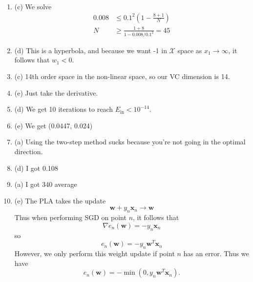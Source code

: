 \documentclass[12pt]{article}
\begin{document}
\begin{enumerate}[leftmargin=*]
\item (c) We solve
\begin{align*}
0.008 &\leq 0.1^2 \left( 1 - \frac{8 + 1}{N} \right) \\
N & \geq \frac{1 + 8}{1 - 0.008 / 0.1^2} = 45
\end{align*}
\item (d) This is a hyperbola, and because we want -1 in $\mathcal X$ space as $x_1 \to \infty$, it follows that $w_1 < 0$.
\item (c) 14th order space in the non-linear space, so our VC dimension is 14.
\item (e) Just take the derivative.
\item (d) We get 10 iterations to reach $E_{\text{in}} < 10^{-14}$.
\item (e) We get (0.0447, 0.024)
\item (a) Using the two-step method sucks because you're not going in the optimal direction.
\item (d) I got 0.108
\item (a) I got 340 average
\item (e) The PLA takes the update
\[ \mathbf w + y_n \mathbf x_n \to \mathbf w \]
Thus when performing SGD on point $n$, it follows that 
\[ \nabla e_n(\mathbf w) = - y_n \mathbf x_n \]
so 
\[ e_n(\mathbf w) = - y_n \mathbf w^T \mathbf x_n \]
However, we only perform this weight update if point $n$ has an error. Thus we have
\[ e_n(\mathbf w) = - \min(0, y_n \mathbf w^T \mathbf x_n). \]
\end{enumerate}
\end{document}
